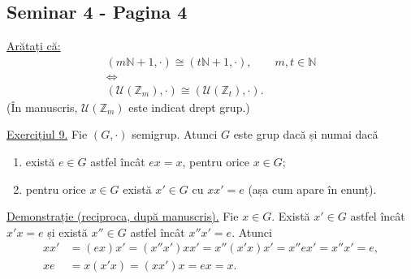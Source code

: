 
\subsection*{Seminar 4 - Pagina 4}

\noindent\underline{Arătați că:}
\[
\begin{gathered}
 (m\mathbb N+1,\cdot)\cong(t\mathbb N+1,\cdot),
 \qquad m,t\in\mathbb N \\[2pt]
 \Longleftrightarrow\\[-2pt]
 (\mathcal U(\mathbb Z_m),\cdot)
   \cong (\mathcal U(\mathbb Z_t),\cdot).
\end{gathered}
\]
\noindent (În manuscris, $\mathcal U(\mathbb Z_m)$ este indicat drept grup.)

\medskip
\noindent\underline{Exercițiul 9.}
Fie $(G,\cdot)$ semigrup. Atunci $G$ este grup dacă și numai dacă
\begin{enumerate}
 \item există $e\in G$ astfel încât $ex=x$, pentru orice $x\in G$;
 \item pentru orice $x\in G$ există $x'\in G$ cu
       $xx'=e$ (așa cum apare în enunț).
\end{enumerate}

\noindent\underline{Demonstrație (reciproca, după manuscris).}
Fie $x\in G$. Există $x'\in G$ astfel încât $x'x=e$ și
există $x''\in G$ astfel încât $x''x'=e$. Atunci
\[
\begin{aligned}
 xx'&=(ex)x'=(x''x')xx'
       =x''(x'x)x'=x''ex'=x''x'=e,\\
 xe&=x(x'x)=(xx')x=ex=x.
\end{aligned}
\]

